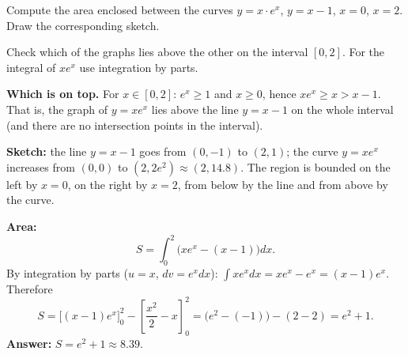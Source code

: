 
\begin{question}
Compute the area enclosed between the curves $y=x\cdot e^x$, $y=x-1$, $x=0$, $x=2$. Draw the corresponding sketch.
\end{question}

\begin{hint}
Check which of the graphs lies above the other on the interval $[0,2]$. For the integral of $xe^x$ use integration by parts.
\end{hint}

\begin{solution}
\textbf{Which is on top.} For $x\in[0,2]$: $e^x\ge1$ and $x\ge0$, hence $xe^x\ge x>x-1$. That is, the graph of $y=xe^x$ lies above the line $y=x-1$ on the whole interval (and there are no intersection points in the interval).

\textbf{Sketch:} the line $y=x-1$ goes from $(0,-1)$ to $(2,1)$; the curve $y=xe^x$ increases from $(0,0)$ to $(2,2e^2)\approx(2,14.8)$. The region is bounded on the left by $x=0$, on the right by $x=2$, from below by the line and from above by the curve.

\textbf{Area:}
\[
S=\int_0^2\big(xe^x-(x-1)\big)dx.
\]
By integration by parts ($u=x$, $dv=e^xdx$): $\int xe^xdx=xe^x-e^x=(x-1)e^x$. Therefore
\[
S=\Big[(x-1)e^x\Big]_0^2-\left[\frac{x^2}{2}-x\right]_0^2=\big(e^2-(-1)\big)-(2-2)=e^2+1.
\]
\textbf{Answer:} $S=e^2+1\approx8.39$.
\end{solution}
